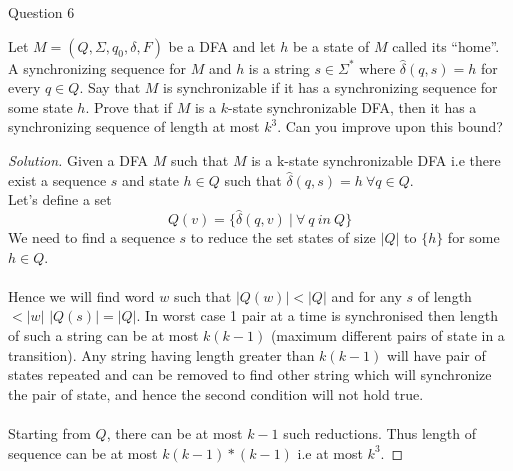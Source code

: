 \begin{solution}{Question 6}\label{ques:6}
    \begin{question}
        Let $M = (Q, \Sigma, q_0, \delta, F)$ be a DFA and let $h$ be a state of $M$ called its ``home”. A synchronizing sequence for $M$ and $h$ is a string $s \in \Sigma^*$ where $\hat{\delta}(q, s) = h$ for
		every $q \in Q$. Say that $M$ is synchronizable if it has a synchronizing sequence for some state $h$. Prove that if $M$ is a $k$-state synchronizable DFA, then it has a synchronizing sequence of length at most $k^3$. Can you improve upon this bound?
    \end{question}
    \tcblower{}
    \begin{proof}[Solution]
        Given a DFA $M$ such that $M$ is a k-state synchronizable DFA i.e there exist a sequence $s$ and state $h \in Q$ such that $\hat{\delta}(q, s) = h\ \forall q \in Q$.
        \\
        Let's define a set
        \[Q(v) = \{\hat{\delta}(q, v)\ |\ \forall\ q\ in\ Q\}\]
        We need to find a sequence $s$ to reduce the set states of size $|Q|$ to $\{h\}$ for some $h \in Q$. 
        \\
        \\
        Hence we will find word $w$ such that $|Q(w)| < |Q|$ and for any $s$ of length $ < |w|$ $|Q(s)| = |Q|$. In worst case 1 pair at a time is synchronised then length of such a string can be at most $k(k-1)$ (maximum different pairs of state in a transition). Any string having length greater than $k(k-1)$ will have pair of states repeated and can be removed to find other string which will synchronize the pair of state, and hence the second condition will not hold true.
        \\
        \\
        Starting from $Q$, there can be at most $k-1$ such reductions. Thus length of sequence can be at most $k(k-1)*(k-1)$ i.e at most $k^3$.
    \end{proof}
\end{solution}
